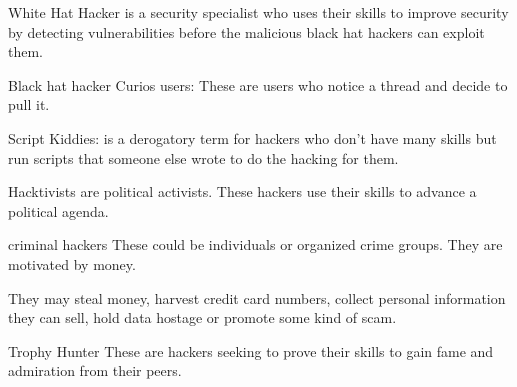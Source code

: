 White Hat Hacker
  is a security specialist who uses their skills to improve security by detecting vulnerabilities
  before the malicious black hat hackers can exploit them.

Black hat hacker 
  Curios users:
    These are users who notice a thread and decide to pull it.

  Script Kiddies:
    is a derogatory term for hackers who don't have many skills 
    but run scripts that someone else wrote to do the hacking for them.

  Hacktivists 
    are political activists. These hackers use their skills to advance a political agenda. 

  criminal hackers
    These could be individuals or organized crime groups. 
    They are motivated by money. 

    They may steal money, 
    harvest credit card numbers, 
    collect personal information they can sell, 
    hold data hostage or promote some kind of scam.
    
  Trophy Hunter 
    These are hackers seeking to prove their skills to gain fame and admiration from their peers.
